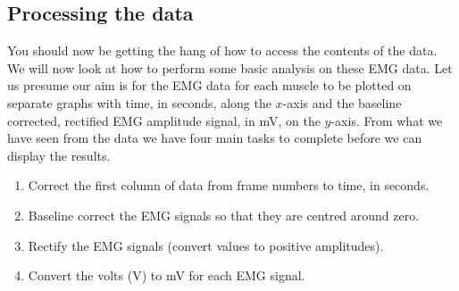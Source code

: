 \documentclass[12pt,a4paper]{article}
\begin{document}
\subsection{Processing the data}
You should now be getting the hang of how to access the contents of the data.  
We will now look at how to perform some basic analysis on these EMG data.  
Let us presume our aim is for the EMG data for each muscle to be plotted on separate graphs with time, in seconds, along the $x$-axis and the baseline corrected, rectified EMG amplitude signal, in mV, on the $y$-axis.  
From what we have seen from the data we have four main tasks to complete before we can display the results.
\begin{enumerate}
	\item Correct the first column of data from frame numbers to time, in seconds.	
	\item Baseline correct the EMG signals so that they are centred around zero.
	\item Rectify the EMG signals (convert values to positive amplitudes).
	\item Convert the volts (V) to mV for each EMG signal.
\end{enumerate}
\end{document}
